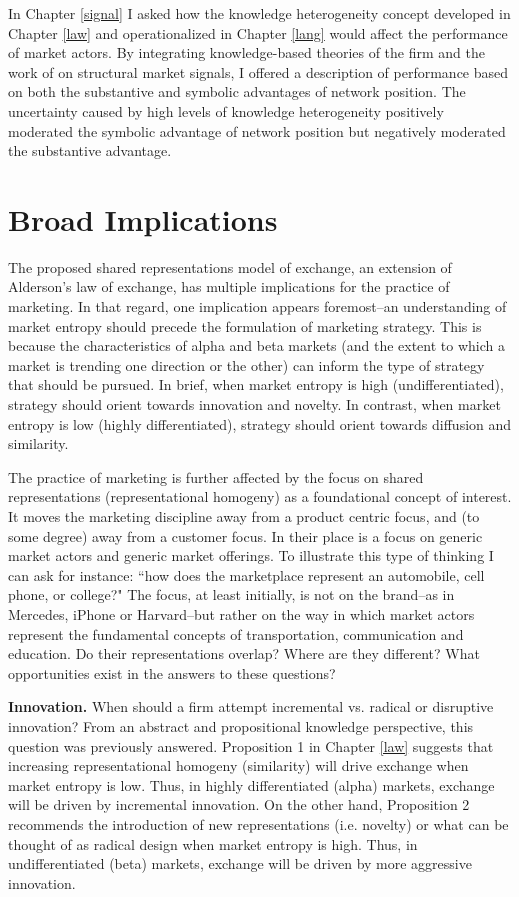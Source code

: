 In Chapter \ref{signal} I asked how the knowledge heterogeneity concept developed in Chapter \ref{law} and operationalized in Chapter \ref{lang} would affect the performance of market actors. By integrating knowledge-based theories of the firm \citep[e.g.][]{powell1996} and the work of \citet{podolny2005} on structural market signals, I offered a description of performance based on both the substantive and symbolic advantages of network position. The uncertainty caused by high levels of knowledge heterogeneity positively moderated the symbolic advantage of network position but negatively moderated the substantive advantage.

\section{Broad Implications}
The proposed shared representations model of exchange, an extension of Alderson's law of exchange, has multiple implications for the practice of marketing. In that regard, one implication appears foremost--an understanding of market entropy should precede the formulation of marketing strategy. This is because the characteristics of alpha and beta markets (and the extent to which a market is trending one direction or the other) can inform the type of strategy that should be pursued. In brief, when market entropy is high (undifferentiated), strategy should orient towards innovation and novelty. In contrast, when market entropy is low (highly differentiated), strategy should orient towards diffusion and similarity.  

The practice of marketing is further affected by the focus on shared representations (representational homogeny) as a foundational concept of interest. It moves the marketing discipline away from a product centric focus, and (to some degree) away from a customer focus. In their place is a focus on generic market actors and generic market offerings. To illustrate this type of thinking I can ask for instance: ``how does the marketplace represent an automobile, cell phone, or college?" The focus, at least initially, is not on the brand--as in Mercedes, iPhone or Harvard--but rather on the way in which market actors represent the fundamental concepts of transportation, communication and education. Do their representations overlap? Where are they different? What opportunities exist in the answers to these questions?     

\textbf{Innovation.}
When should a firm attempt incremental vs. radical or disruptive innovation? From an abstract and propositional knowledge perspective, this question was previously answered. Proposition 1 in Chapter \ref{law} suggests that increasing representational homogeny (similarity) will drive exchange when market entropy is low. Thus, in highly differentiated (alpha) markets, exchange will be driven by incremental innovation. On the other hand, Proposition 2 recommends the introduction of new representations (i.e. novelty) or what can be thought of as radical design when market entropy is high. Thus, in undifferentiated (beta) markets, exchange will be driven by more aggressive innovation. 

